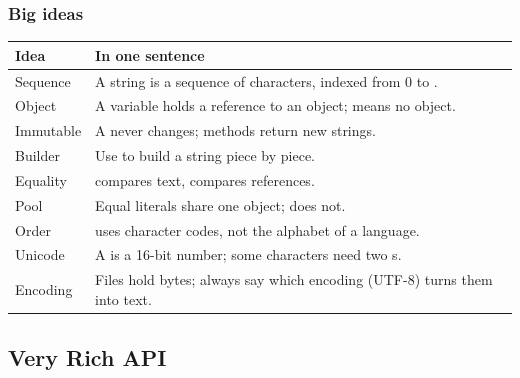 \documentclass[aspectratio=169,10pt,compress]{beamer}
\begin{document}
\begin{frame}[t,fragile] \frametitle{Big ideas}
  \small
  \begin{tabular}{@{}L{0.25\textwidth}L{0.68\textwidth}@{}}
    \toprule
    \textbf{Idea} & \textbf{In one sentence} \\
    \midrule
    Sequence         & A string is a sequence of characters, indexed from 0 to . \\
    Object           & A  variable holds a reference to an object;  means no object. \\
    Immutable        & A  never changes; methods return new strings. \\
    Builder          & Use  to build a string piece by piece. \\
    Equality         &  compares text, \hCode{==} compares references. \\
    Pool             & Equal literals share one object;  does not. \\
    Order            &  uses character codes, not the alphabet of a language. \\
    Unicode          & A  is a 16-bit number; some characters need two s. \\
    Encoding         & Files hold bytes; always say which encoding (UTF-8) turns them into text. \\
    \bottomrule
  \end{tabular}
\end{frame}


\subsection[API]{Very Rich API }
\end{document}
